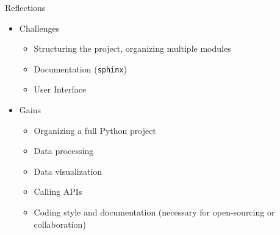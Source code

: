\documentclass{beamer}
\begin{document}
\begin{frame}{Reflections}
\begin{itemize}
    \item Challenges
    \begin{itemize}
        \item Structuring the project, organizing multiple modules
        \item Documentation (\texttt{sphinx})
        \item User Interface
    \end{itemize}
    \item Gains
    \begin{itemize}
        \item Organizing a full Python project
        \item Data processing
        \item Data visualization
        \item Calling APIs
        \item Coding style and documentation (necessary for open-sourcing or collaboration)
    \end{itemize}
    
\end{itemize}
    
\end{frame}
\end{document}
